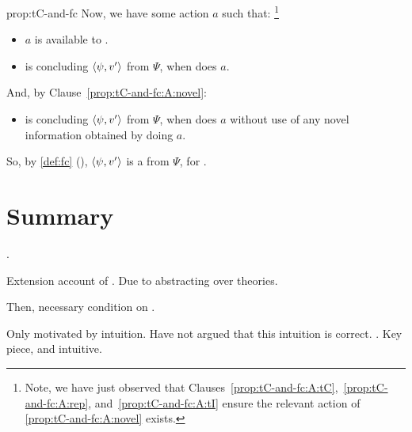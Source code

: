 \begin{note}
\begin{argument}{prop:tC-and-fc}
    \noindent%
    Now, we have some action \(a\) such that:%
    \footnote{
      Note, we have just observed that Clauses~\ref{prop:tC-and-fc:A:tC},~\ref{prop:tC-and-fc:A:rep}, and~\ref{prop:tC-and-fc:A:tI} ensure the relevant action of  \ref{prop:tC-and-fc:A:novel} exists.
    }

    \begin{itemize}[noitemsep]
    \item
      \(a\) is available to \vAgent{}.
    \item
      \vAgent{} is concluding \(\langle \psi, v' \rangle\) from \(\Psi\), when \vAgent{} does \(a\).
    \end{itemize}

    \noindent%
    And, by Clause~\ref{prop:tC-and-fc:A:novel}:

    \begin{itemize}[noitemsep]
    \item
      \vAgent{} is concluding \(\langle \psi, v' \rangle\) from \(\Psi\), when \vAgent{} does \(a\) without use of any novel information obtained by doing \(a\).
    \end{itemize}

    \noindent%
    So, by \autoref{def:fc} (), \(\langle \psi, v' \rangle\) is a  from \(\Psi\), for \vAgent{}.
  \end{argument}
\end{note}



\section*{Summary}

\begin{note}
  .

  Extension account of \torN{}.
  Due to abstracting over theories.

  Then, necessary condition on \tC{}.
\end{note}

\begin{note}
  Only motivated \tC{} by intuition.
  Have not argued that this intuition is correct.
  .
  Key piece, and intuitive.
\end{note}



